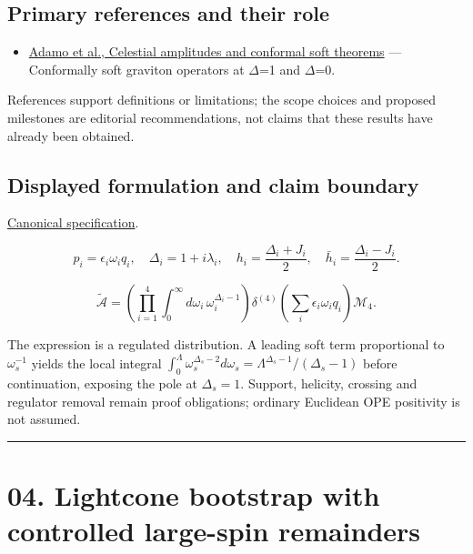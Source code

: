 \documentclass[
  11pt,
]{article}
\providecommand{\tightlist}{%
  \setlength{\itemsep}{0pt}\setlength{\parskip}{0pt}}
\begin{document}
\subsection{Primary references and their role}

\begin{itemize}
\tightlist
\item
  \href{https://www.pure.ed.ac.uk/ws/files/121747399/Adamo_2019_Class._Quantum_Grav._36_205018_1_.pdf}{Adamo
  et al., Celestial amplitudes and conformal soft theorems} ---
  Conformally soft graviton operators at \ensuremath{\Delta}=1 and
  \ensuremath{\Delta}=0.
\end{itemize}

References support definitions or limitations; the scope choices and
proposed milestones are editorial recommendations, not claims that these
results have already been obtained.

\subsection{Displayed formulation and claim boundary}

\href{https://github.com/rick-stevens-ai/Pure-Thought/blob/main/PRDs/03-Celestial-CFT-Bootstrap.md}{Canonical
specification}.

\[p_i=\epsilon_i\omega_i q_i,\quad
\Delta_i=1+i\lambda_i,\quad
h_i=\frac{\Delta_i+J_i}{2},\quad
\bar h_i=\frac{\Delta_i-J_i}{2}.\]

\[\widetilde{\mathcal A}=
\left(\prod_{i=1}^4\int_0^\infty d\omega_i\,\omega_i^{\Delta_i-1}\right)
\delta^{(4)}\!\left(\sum_i\epsilon_i\omega_iq_i\right)\mathcal M_4.\]

The expression is a regulated distribution. A leading soft term
proportional to \(\omega_s^{-1}\) yields the local integral
\(\int_0^\Lambda\omega_s^{\Delta_s-2}d\omega_s=\Lambda^{\Delta_s-1}/(\Delta_s-1)\)
before continuation, exposing the pole at \(\Delta_s=1\). Support,
helicity, crossing and regulator removal remain proof obligations;
ordinary Euclidean OPE positivity is not assumed.

\begin{center}\rule{0.5\linewidth}{0.5pt}\end{center}

\section{04. Lightcone bootstrap with controlled large-spin remainders}
\end{document}
